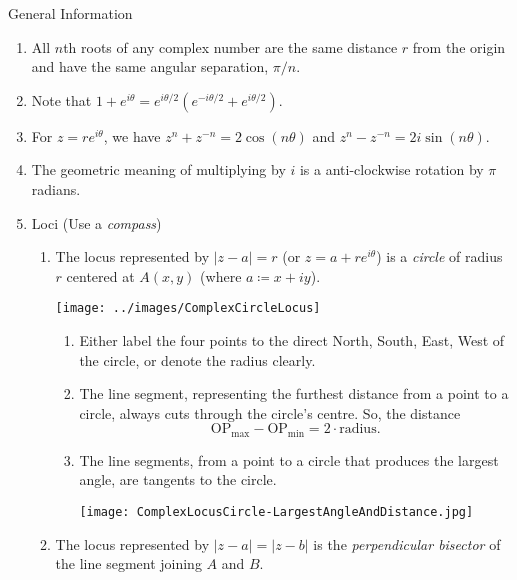 \documentclass[oneside]{book}
\begin{document}
\begin{stbox}{General Information}
  \begin{enumerate}
    \item All \(n\)th roots of any complex number are the same distance \(r\) from the origin and have the same angular separation, \(\pi/n\).
    \item Note that \(1+e^{i\theta}=e^{i\theta/2}(e^{-i\theta/2}+e^{i\theta/2})\).
    \item For \(z=re^{i\theta}\), we have \(z^n+z^{-n}=2\cos(n\theta)\) and \(z^n-z^{-n}=2i\sin(n\theta)\).
    \item The geometric meaning of multiplying by \(i\) is a anti-clockwise rotation by \(\pi\) radians.
    \item Loci (Use a \emph{compass})
    \begin{enumerate}
      \item The locus represented by \(\lvert z-a \rvert =r\) (or \(z=a+re^{i\theta}\)) is a \emph{circle} of radius \(r\) centered at \(A(x,y)\) (where \(a\coloneq x+iy\)).
      \begin{center}
        \texttt{[image: ../images/ComplexCircleLocus]}
      \end{center}
      \begin{enumerate}
        \item Either label the four points to the direct North, South, East, West of the circle, or denote the radius clearly. 
        \item The line segment, representing the furthest distance from a point to a circle, always cuts through the circle's centre. So, the distance
        \[\text{OP}_{\text{max}}-\text{OP}_{\text{min}}=2\cdot\text{radius}.\]
        \item The line segments, from a point to a circle that produces the largest angle, are tangents to the circle.
        \begin{center}
          \texttt{[image: ComplexLocusCircle-LargestAngleAndDistance.jpg]}
        \end{center}
      \end{enumerate}
      \item The locus represented by \(\lvert z-a \rvert =\lvert z-b \rvert\) is the \emph{perpendicular bisector} of the line segment joining \(A\) and \(B\).
      \begin{center}

\end{center}
\end{enumerate}
\end{enumerate}
\end{stbox}
\end{document}
